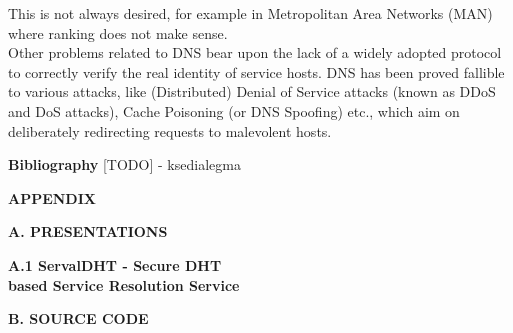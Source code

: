 \documentclass[12pt,a4paper,oneside]{article}
\begin{document}
This is not always desired, for example in Metropolitan Area Networks (MAN)  where ranking does not make sense.\\
\indent Other problems related to DNS bear upon the lack of a widely adopted protocol to correctly verify the real identity of service hosts.
DNS has been proved fallible to various attacks, like (Distributed) Denial of Service attacks (known as DDoS  and DoS  attacks), Cache Poisoning (or DNS Spoofing) etc., which aim on deliberately redirecting requests to malevolent hosts.




\newpage
{}
{}
{\Huge \bf \noindent Bibliography}
[TODO] - ksedialegma
\nocite{*}

\renewcommand{\refname}{}



\newpage
\pagestyle{empty}
{}
{\Huge \bf \noindent APPENDIX}
\newpage

\newpage
{}
{}
{\Huge \bf \noindent A. PRESENTATIONS}


\newpage
{}
{}
\label{sec:servaldhtpres}
{\huge \bf \noindent A.1 ServalDHT - Secure DHT\\[0.2cm] based Service Resolution Service}



\newpage
{}
{}
\label{sec:sourcecode}
{\Huge \bf \noindent B. SOURCE CODE}
\end{document}
